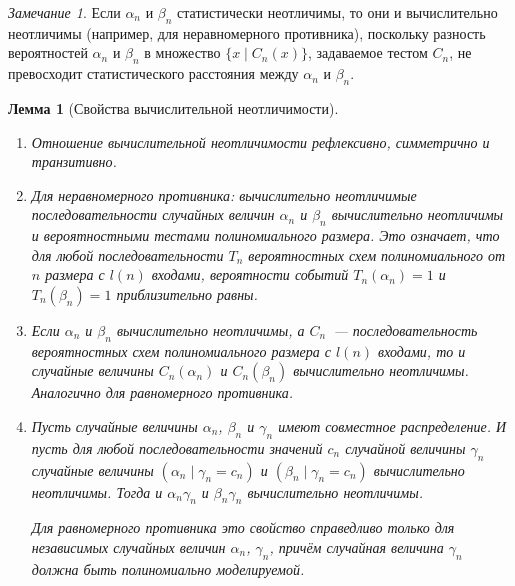 \documentclass[12pt,a4paper]{article}
\theoremstyle{definition}
\theoremstyle{plain}
\newtheorem{lemma}{Лемма}[section]
\theoremstyle{remark}
\newtheorem{remark}{Замечание}[section]
\begin{document}
\begin{remark}
Если $\alpha_n$ и $\beta_n$ статистически неотличимы,
то они и вычислительно неотличимы (например, для неравномерного
противника), поскольку разность вероятностей $\alpha_n$
и $\beta_n$ в множество $\{x\mid C_n(x)\}$, задаваемое
тестом $C_n$, не превосходит статистического расстояния
между $\alpha_n$ и $\beta_n$.
\end{remark}

\begin{lemma}[Свойства вычислительной неотличимости]
\mbox{}
\begin{enumerate}
\item Отношение вычислительной неотличимости рефлексивно, симметрично и транзитивно.

\item Для неравномерного противника: вычислительно неотличимые
последовательности случайных величин $\alpha_n$ и $\beta_n$
вычислительно неотличимы и вероятностными тестами 
полиномиального размера. Это означает, что для любой последовательности
$T_n$ вероятностных схем полиномиального от $n$ размера с $l(n)$
входами, вероятности событий $T_n(\alpha_n) = 1$ и $T_n(\beta_n) = 1$
приблизительно равны.

\item Если $\alpha_n$ и $\beta_n$ вычислительно неотличимы,
а $C_n$~--- последовательность вероятностных схем полиномиального размера с $l(n)$ входами, то и случайные
величины $C_n(\alpha_n)$ и $C_n(\beta_n)$ вычислительно
неотличимы. Аналогично для равномерного противника.

\item Пусть случайные величины $\alpha_n$, $\beta_n$
и $\gamma_n$ имеют совместное распределение. И пусть
для любой последовательности значений $c_n$ случайной
величины $\gamma_n$ случайные величины 
$(\alpha_n\mid\gamma_n = c_n)$ и 
$(\beta_n\mid\gamma_n = c_n)$ вычислительно неотличимы.
Тогда и $\alpha_n\gamma_n$ и $\beta_n\gamma_n$ вычислительно
неотличимы.

Для равномерного противника это свойство справедливо только
для независимых случайных величин $\alpha_n$, $\gamma_n$,
причём случайная величина $\gamma_n$ должна быть полиномиально моделируемой.
\end{enumerate}
\end{lemma}
\end{document}
